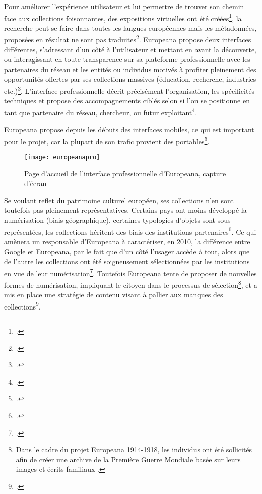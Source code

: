 Pour améliorer l'expérience utilisateur et lui permettre de trouver son chemin face aux collections foisonnantes, des expositions virtuelles ont été créées\footcite{europeana_europeana_nodate-2}, la recherche peut se faire dans toutes les langues européennes mais les métadonnées, proposées en résultat ne sont pas traduites\footcite{noauthor_european_2019}. Europeana propose deux interfaces différentes, s'adressant d'un côté à l'utilisateur  et mettant en avant la découverte, ou interagissant en toute transparence sur sa plateforme professionnelle avec les partenaires du réseau et les entités ou individus motivés à profiter pleinement des opportunités offertes par ses collections massives (éducation, recherche, industries etc.)\footcite{ioana_roiu_cristina_family_nodate}. L'interface professionnelle décrit précisément l'organisation, les spécificités techniques et propose des accompagnements ciblés selon si l'on se positionne en tant que partenaire du réseau, chercheur, ou futur exploitant\footcite{europeana_europeana_nodate-2}. 

Europeana propose depuis les débuts des interfaces mobiles, ce qui est important pour le projet, car la plupart de son trafic provient des portables\footcite{xie_discover_2016}.
 \newpage
\begin{figure}[H]%
\centering
\texttt{[image: europeanapro]}
\caption{Page d'accueil de l'interface professionnelle d'Europeana, capture d'écran}
\end{figure}

Se voulant reflet du patrimoine culturel européen, ses collections n'en sont toutefois pas pleinement représentatives. Certains pays ont moins développé la numérisation (biais géographique), certaines typologies d'objets sont sous-représentées, les collections héritent des biais des institutions partenaires\footcite{thylstrup_politics_2018}. Ce qui amènera un responsable d'Europeana à caractériser, en 2010, la différence entre Google et Europeana, par le fait que d'un côté l'usager accède à tout, alors que de l'autre les collections ont été soigneusement sélectionnées par les institutions en vue de leur numérisation\footcite{thelle_persuasive_2011}. Toutefois Europeana tente de proposer de nouvelles formes de numérisation, impliquant le citoyen dans le processus de sélection\footnote{Dans le cadre du projet Europeana 1914-1918, les individus ont été sollicités afin de créer une archive de la Première Guerre Mondiale basée sur leurs images et écrits familiaux \cite{ioana_roiu_cristina_family_nodate}.}, et a mis en place une stratégie de contenu visant à pallier aux manques des collections\footcite{europeana_everything_nodate}.


